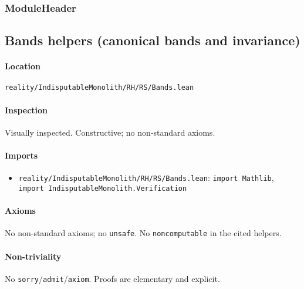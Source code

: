 \documentclass{article}
\newcommand{\FileRef}[1]{\texttt{#1}}
\newcommand{\ModuleHeader}[3]{%
  \subsection{#1}
  \paragraph{Location} \FileRef{#2}\\
  \paragraph{Inspection} #3
}
\begin{document}
\subsubsection{ModuleHeader}
\ModuleHeader{Bands helpers (canonical bands and invariance)}{reality/IndisputableMonolith/RH/RS/Bands.lean}{Visually inspected. Constructive; no non‑standard axioms.}

\paragraph{Imports}
\begin{itemize}[leftmargin=*]
  \item \FileRef{reality/IndisputableMonolith/RH/RS/Bands.lean}: \texttt{import Mathlib}, \texttt{import IndisputableMonolith.Verification}
\end{itemize}

\paragraph{Axioms}
No non‑standard axioms; no \texttt{unsafe}. No \texttt{noncomputable} in the cited helpers.

\paragraph{Non-triviality}
No \texttt{sorry}/\texttt{admit}/\texttt{axiom}. Proofs are elementary and explicit.
\end{document}

